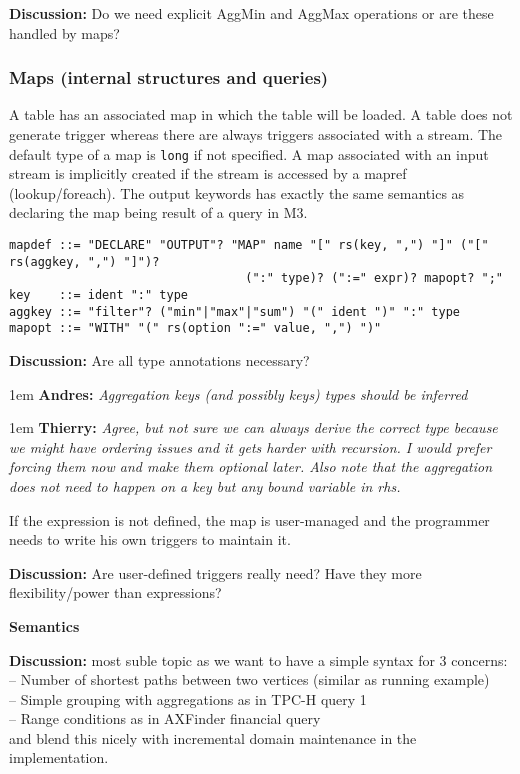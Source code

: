 \documentclass[11pt]{article}
\newlength{\dlen}
\def\discuss#1{\par\hspace{2em}
\setlength{\dlen}{\textwidth}
\addtolength{\dlen}{-2em}
\begin{minipage}{\dlen}\footnotesize {\bf\color{red} Discussion:} #1\end{minipage}\par}
\def\say#1#2{\begingroup\par\leftskip1em {\bf #1:} \it #2\par\endgroup}
\begin{document}
\discuss{Do we need explicit AggMin and AggMax operations or are these handled by maps?}

\subsubsection*{Maps (internal structures and queries)}
A table has an associated map in which the table will be loaded. A table does not generate trigger whereas there are always triggers associated with a stream. The default type of a map is {\tt long} if not specified. A map associated with an input stream is implicitly created if the stream is accessed by a mapref (lookup/foreach). The output keywords has exactly the same semantics as declaring the map being result of a query in M3.

\begin{verbatim}
mapdef ::= "DECLARE" "OUTPUT"? "MAP" name "[" rs(key, ",") "]" ("[" rs(aggkey, ",") "]")? 
                                 (":" type)? (":=" expr)? mapopt? ";" 
key    ::= ident ":" type
aggkey ::= "filter"? ("min"|"max"|"sum") "(" ident ")" ":" type
mapopt ::= "WITH" "(" rs(option ":=" value, ",") ")"
\end{verbatim}
\discuss{Are all type annotations necessary?
	\say{Andres}{Aggregation keys (and possibly keys) types should be inferred}
	\say{Thierry}{Agree, but not sure we can always derive the correct type because we might have ordering issues and it gets harder with recursion. I would prefer forcing them now and make them optional later. Also note that the aggregation does not need to happen on a key but any bound variable in rhs.}}

If the expression is not defined, the map is user-managed and the programmer needs to write his own triggers to maintain it.
\discuss{Are user-defined triggers really need? Have they more flexibility/power than expressions?}

{\bf Semantics}
\discuss{most suble topic as we want to have a simple syntax for 3 concerns:\\
-- Number of shortest paths between two vertices (similar as \cite{socialite} running example)\\
-- Simple grouping with aggregations as in TPC-H query 1\\
-- Range conditions as in AXFinder financial query\\
and blend this nicely with incremental domain maintenance in the implementation.}
\end{document}

